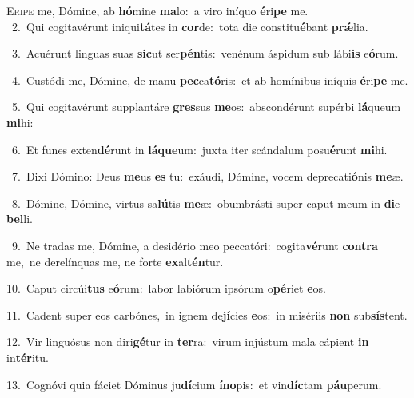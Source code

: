 \lettrine{\initial\textcolor{\initialcolor}{E}}{ripe} me, Dómine, ab \textbf{hó}\-mine \textbf{ma}\-lo:~\star a viro iníquo \textbf{é}\-ri\textbf{pe} me.\\
{\numbfont\textcolor{\numbcolor}{~2.}}~Qui cogitavérunt iniqui\-\textbf{tá}\-tes in \textbf{cor}\-de:~\star tota die constitu\-\textbf{é}\-bant \textbf{prǽ}\-lia.\par
{\numbfont\textcolor{\numbcolor}{~3.}}~Acuérunt linguas suas \textbf{sic}\-ut ser\-\textbf{pén}\-tis:~\star venénum áspidum sub lábi\textbf{is} e\-\textbf{ó}\-rum.\par
{\numbfont\textcolor{\numbcolor}{~4.}}~Custódi me, Dómine, de manu \textbf{pec}\-ca\-\textbf{tó}\-ris:~\star et ab homínibus iníquis \textbf{é}\-ri\textbf{pe} me.\par
{\numbfont\textcolor{\numbcolor}{~5.}}~Qui cogitavérunt supplantáre \textbf{gres}\-sus \textbf{me}\-os:~\star abscondérunt supérbi \textbf{lá}\-queum \textbf{mi}\-hi:\par
{\numbfont\textcolor{\numbcolor}{~6.}}~Et funes exten\-\textbf{dé}\-runt in \textbf{lá}\-\textbf{que}um:~\star juxta iter scándalum posu\-\textbf{é}\-runt \textbf{mi}\-hi.\par
{\numbfont\textcolor{\numbcolor}{~7.}}~Dixi Dómino: Deus \textbf{me}\-us \textbf{es} tu:~\star exáudi, Dómine, vocem deprecati\-\textbf{ó}\-nis \textbf{me}\-æ.\par
{\numbfont\textcolor{\numbcolor}{~8.}}~Dómine, Dómine, virtus sa\-\textbf{lú}\-tis \textbf{me}\-æ:~\star obumbrásti super caput meum in \textbf{di}\-e \textbf{bel}\-li.\par
{\numbfont\textcolor{\numbcolor}{~9.}}~Ne tradas me, Dómine, a desidério meo peccatóri:~\dagger cogita\-\textbf{vé}\-runt \textbf{con}\-\textbf{tra} me,~\star ne derelínquas me, ne forte \textbf{ex}\-al\-\textbf{tén}\-tur.\par
{\numbfont\textcolor{\numbcolor}{10.}}~Caput circúi\textbf{tus} e\-\textbf{ó}\-rum:~\star labor labiórum ipsórum o\-\textbf{pé}\-riet \textbf{e}\-os.\par
{\numbfont\textcolor{\numbcolor}{11.}}~Cadent super eos carbónes,~\dagger in ignem de\-\textbf{jí}\-cies \textbf{e}\-os:~\star in misériis \textbf{non} sub\-\textbf{sís}\-tent.\par
{\numbfont\textcolor{\numbcolor}{12.}}~Vir linguósus non diri\-\textbf{gé}\-tur in \textbf{ter}\-ra:~\star virum injústum mala cápient \textbf{in} in\-\textbf{tér}\-itu.\par
{\numbfont\textcolor{\numbcolor}{13.}}~Cognóvi quia fáciet Dóminus ju\-\textbf{dí}\-cium \textbf{ín}\-\textbf{o}pis:~\star et vin\-\textbf{díc}\-tam \textbf{páu}\-perum.\par
